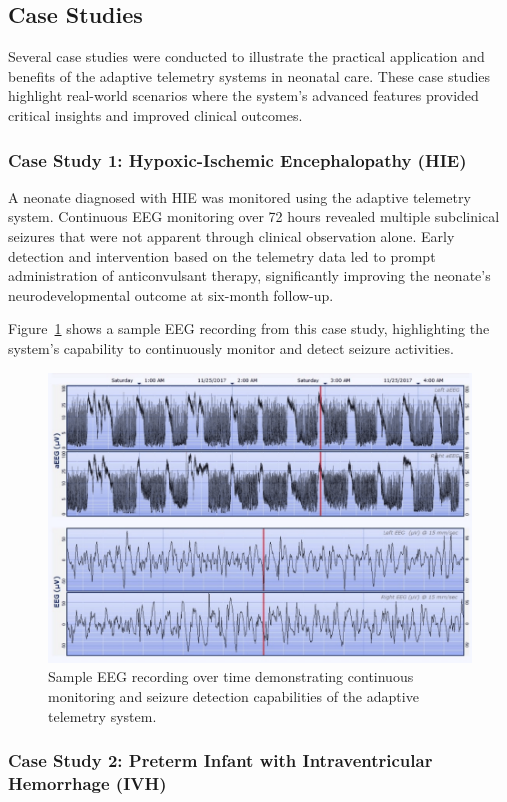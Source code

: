 \documentclass[12pt,journal,compsoc]{IEEEtran}
\begin{document}
\subsection{Case Studies}
Several case studies were conducted to illustrate the practical application and benefits of the adaptive telemetry systems in neonatal care. These case studies highlight real-world scenarios where the system's advanced features provided critical insights and improved clinical outcomes.

\subsubsection{Case Study 1: Hypoxic-Ischemic Encephalopathy (HIE)}

A neonate diagnosed with HIE was monitored using the adaptive telemetry system. Continuous EEG monitoring over 72 hours revealed multiple subclinical seizures that were not apparent through clinical observation alone. Early detection and intervention based on the telemetry data led to prompt administration of anticonvulsant therapy, significantly improving the neonate's neurodevelopmental outcome at six-month follow-up.

Figure~\ref{fig:eeg_data} shows a sample EEG recording from this case study, highlighting the system's capability to continuously monitor and detect seizure activities.

\begin{figure}[H]
    \centering
    \includegraphics[width=0.8\linewidth]{case_studies_aEEG_vs_EEG.png}
    \caption{Sample EEG recording over time demonstrating continuous monitoring and seizure detection capabilities of the adaptive telemetry system.}
    \label{fig:eeg_data}
\end{figure}

\subsubsection{Case Study 2: Preterm Infant with Intraventricular Hemorrhage (IVH)}
\end{document}
